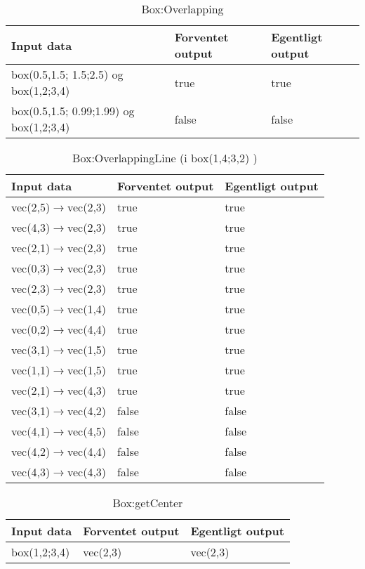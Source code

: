 \begin{table}[h!]
	\caption{Box:Overlapping}
	\centering
	\begin{tabular}{L L L}
		\hline\hline
		Input data & Forventet output & Egentligt output \\ [0.5ex]
		\hline
		box(0.5,1.5; 1.5;2.5) og box(1,2;3,4) & true & true\\
		box(0.5,1.5; 0.99;1.99) og box(1,2;3,4) & false & false\\
		\hline
	\end{tabular}
\end{table}

\begin{table}[h!]
	\caption{Box:OverlappingLine (i box(1,4;3,2) )}
	\centering
	\begin{tabular}{L L L}
		\hline\hline
		Input data & Forventet output & Egentligt output \\ [0.5ex]
		\hline
		vec(2,5)$\to$vec(2,3) & true & true\\
		vec(4,3)$\to$vec(2,3) & true & true\\
		vec(2,1)$\to$vec(2,3) & true & true\\
		vec(0,3)$\to$vec(2,3) & true & true\\
		vec(2,3)$\to$vec(2,3) & true & true\\
		vec(0,5)$\to$vec(1,4) & true & true\\
		vec(0,2)$\to$vec(4,4) & true & true\\
		vec(3,1)$\to$vec(1,5) & true & true\\
		vec(1,1)$\to$vec(1,5) & true & true\\
		vec(2,1)$\to$vec(4,3) & true & true\\
		\hline
		vec(3,1)$\to$vec(4,2) & false & false\\
		vec(4,1)$\to$vec(4,5) & false & false\\
		vec(4,2)$\to$vec(4,4) & false & false\\
		vec(4,3)$\to$vec(4,3) & false & false\\
		\hline
	\end{tabular}
\end{table}

\begin{table}[h!]
	\caption{Box:getCenter}
	\centering
	\begin{tabular}{L L L}
		\hline\hline
		Input data & Forventet output & Egentligt output \\ [0.5ex]
		\hline
		box(1,2;3,4) & vec(2,3) & vec(2,3)\\
		\hline
	\end{tabular}
\end{table}

